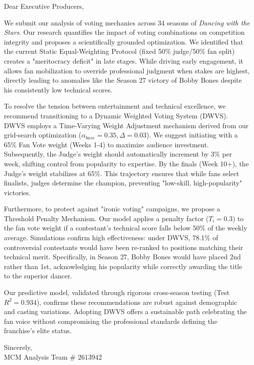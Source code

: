 \documentclass{mcmthesis}
\begin{document}
\begin{memo}[Memorandum]


\noindent Dear Executive Producers,

We submit our analysis of voting mechanics across 34 seasons of \textit{Dancing with the Stars}. Our research quantifies the impact of voting combinations on competition integrity and proposes a scientifically grounded optimization. We identified that the current Static Equal-Weighting Protocol (fixed 50\% judge/50\% fan split) creates a "meritocracy deficit" in late stages. While driving early engagement, it allows fan mobilization to override professional judgment when stakes are highest, directly leading to anomalies like the Season 27 victory of Bobby Bones despite his consistently low technical scores.

To resolve the tension between entertainment and technical excellence, we recommend transitioning to a Dynamic Weighted Voting System (DWVS). DWVS employs a Time-Varying Weight Adjustment mechanism derived from our grid-search optimization ($\alpha_{base}=0.35, \Delta=0.03$). We suggest initiating with a 65\% Fan Vote weight (Weeks 1-4) to maximize audience investment. Subsequently, the Judge's weight should automatically increment by 3\% per week, shifting control from popularity to expertise. By the finals (Week 10+), the Judge's weight stabilizes at 65\%. This trajectory ensures that while fans select finalists, judges determine the champion, preventing "low-skill, high-popularity" victories.

Furthermore, to protect against "ironic voting" campaigns, we propose a Threshold Penalty Mechanism. Our model applies a penalty factor ($T_i=0.3$) to the fan vote weight if a contestant's technical score falls below 50\% of the weekly average. Simulations confirm high effectiveness: under DWVS, 78.1\% of controversial contestants would have been re-ranked to positions matching their technical merit. Specifically, in Season 27, Bobby Bones would have placed 2nd rather than 1st, acknowledging his popularity while correctly awarding the title to the superior dancer.

Our predictive model, validated through rigorous cross-season testing (Test $R^2=0.934$), confirms these recommendations are robust against demographic and casting variations. Adopting DWVS offers a sustainable path celebrating the fan voice without compromising the professional standards defining the franchise's elite status.

\begin{flushright}
Sincerely, \\
MCM Analysis Team \# 2613942
\end{flushright}

\end{memo}
\end{document}
